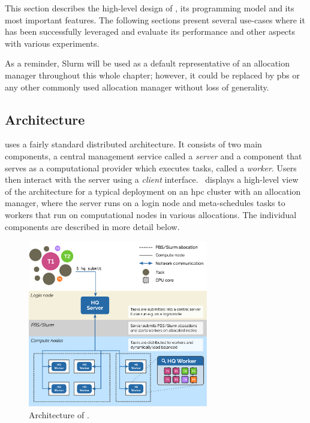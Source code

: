 This section describes the high-level design of \hyperqueue{}, its programming model and
its most important features. The following sections present several use-cases where it has been
successfully leveraged and evaluate its performance and other aspects with various experiments.

As a reminder, Slurm will be used as a default representative of an allocation manager throughout
this whole chapter; however, it could be replaced by \gls{pbs} or any other commonly
used allocation manager without loss of generality.

\subsection{Architecture}
\label{hq:architecture}
\hyperqueue{} uses a fairly standard distributed architecture. It consists of two main
components, a central management service called a \emph{server} and a component that
serves as a computational provider which executes tasks, called a \emph{worker}. Users
then interact with the server using a \emph{client} interface.~
displays a high-level view of the \hq{} architecture for a typical deployment on
an \gls{hpc} cluster with an allocation manager, where the server runs on a login
node and meta-schedules tasks to workers that run on computational nodes in various allocations.
The individual components are described in more detail below.

\begin{figure}[h]
	\centering
	\includegraphics[width=0.7\textwidth]{imgs/hq/architecture}
	\caption{Architecture of \hyperqueue{}.}
	\label{fig:hq-architecture}
\end{figure}

